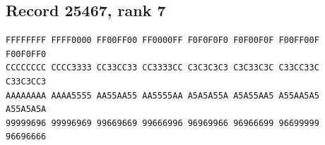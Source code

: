 \documentclass[11pt]{amsart}
\theoremstyle{definition}
\theoremstyle{remark}
\numberwithin{equation}{section}
\numberwithin{table}{section}
\begin{document}
\subsection*{Record 25467, rank 7}
\begin{Verbatim}[fontsize=\scriptsize,xleftmargin=1em]
FFFFFFFF FFFF0000 FF00FF00 FF0000FF F0F0F0F0 F0F00F0F F00FF00F F00F0FF0
CCCCCCCC CCCC3333 CC33CC33 CC3333CC C3C3C3C3 C3C33C3C C33CC33C C33C3CC3
AAAAAAAA AAAA5555 AA55AA55 AA5555AA A5A5A55A A5A55AA5 A55AA5A5 A55A5A5A
99999696 99996969 99669669 99666996 96969966 96966699 96699999 96696666
\end{Verbatim}
\par
{}\par
\end{document}
